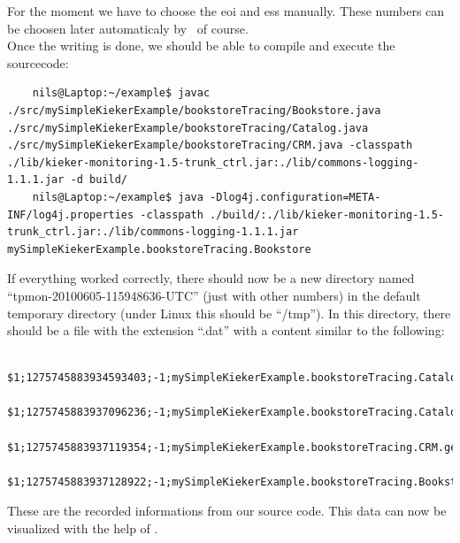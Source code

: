       For the moment we have to choose the eoi and ess manually. These numbers can be choosen later automaticaly by \Kieker\ of course.\\
      Once the writing is done, we should be able to compile and execute the sourcecode:
      \setBashListing
      \begin{lstlisting}
	nils@Laptop:~/example$ javac ./src/mySimpleKiekerExample/bookstoreTracing/Bookstore.java ./src/mySimpleKiekerExample/bookstoreTracing/Catalog.java ./src/mySimpleKiekerExample/bookstoreTracing/CRM.java -classpath ./lib/kieker-monitoring-1.5-trunk_ctrl.jar:./lib/commons-logging-1.1.1.jar -d build/
	nils@Laptop:~/example$ java -Dlog4j.configuration=META-INF/log4j.properties -classpath ./build/:./lib/kieker-monitoring-1.5-trunk_ctrl.jar:./lib/commons-logging-1.1.1.jar mySimpleKiekerExample.bookstoreTracing.Bookstore
      \end{lstlisting}
      If everything worked correctly, there should now be a new directory named ``tpmon-20100605-115948636-UTC'' (just with other numbers) in the default temporary directory (under Linux this should be ``/tmp''). In this directory, there should be a file with the extension ``.dat'' with a content similar to the following:
      \begin{lstlisting}
	$1;1275745883934593403;-1;mySimpleKiekerExample.bookstoreTracing.Catalog.getBook(false);sessionID;0;1275745883931011663;1275745883933424540;vnName;1;1
	$1;1275745883937096236;-1;mySimpleKiekerExample.bookstoreTracing.Catalog.getBook(false);sessionID;0;1275745883935003302;1275745883937075214;vnName;3;2
	$1;1275745883937119354;-1;mySimpleKiekerExample.bookstoreTracing.CRM.getOffers();sessionID;0;1275745883934661568;1275745883937111043;vnName;2;1
	$1;1275745883937128922;-1;mySimpleKiekerExample.bookstoreTracing.Bookstore.searchBook();sessionID;0;1275745883931007961;1275745883937123824;vnName;0;0 
      \end{lstlisting}
      These are the recorded informations from our source code. This data can now be visualized with the help of \Kieker.

